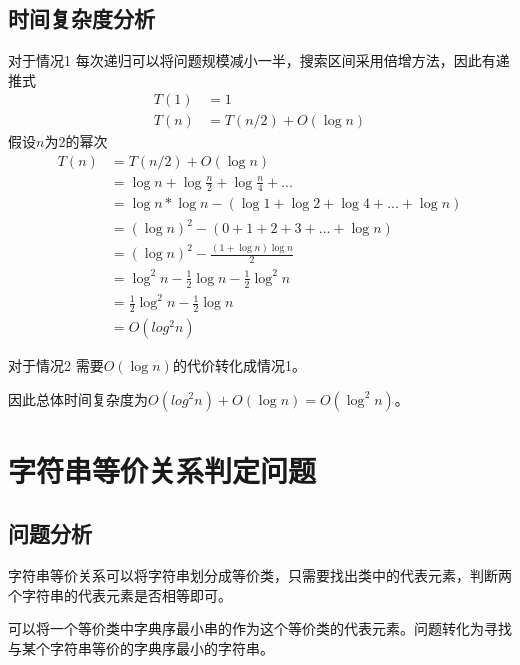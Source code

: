 \subsection*{时间复杂度分析}

对于情况1
每次递归可以将问题规模减小一半，搜索区间采用倍增方法，因此有递推式
\begin{equation}
    \begin{aligned}
        T(1) &= 1\\
        T(n) & =T(n/2) + O(\log n)
    \end{aligned}
    \nonumber
\end{equation}
假设$n$为2的幂次
\begin{equation}
    \begin{aligned}
        T(n) &= T(n/2) + O(\log n)\\
            &= \log n + \log \frac{n}{2} + \log \frac{n}{4} + ...\\
            &= \log n * \log n - (\log 1 + \log 2 + \log 4 + ... + \log n)\\
            &= (\log n) ^ 2 - (0+1+2+3+...+\log n)\\
            &= (\log n)^2 - \frac{(1+\log n)\log n}{2}\\
            &= \log^2 n - \frac{1}{2}\log n - \frac{1}{2} \log^2 n\\
            &= \frac{1}{2} \log^2 n - \frac{1}{2} \log n\\
            &= O(log^2 n)
    \end{aligned}
    \nonumber
\end{equation}

对于情况2
需要$O(\log n)$的代价转化成情况1。

因此总体时间复杂度为$O(log^2 n) + O(\log n) = O(\log ^2 n)$。

\section{字符串等价关系判定问题}

\subsection*{问题分析}

字符串等价关系可以将字符串划分成等价类，只需要找出类中的代表元素，判断两个字符串的代表元素是否相等即可。

可以将一个等价类中字典序最小串的作为这个等价类的代表元素。问题转化为寻找与某个字符串等价的字典序最小的字符串。

